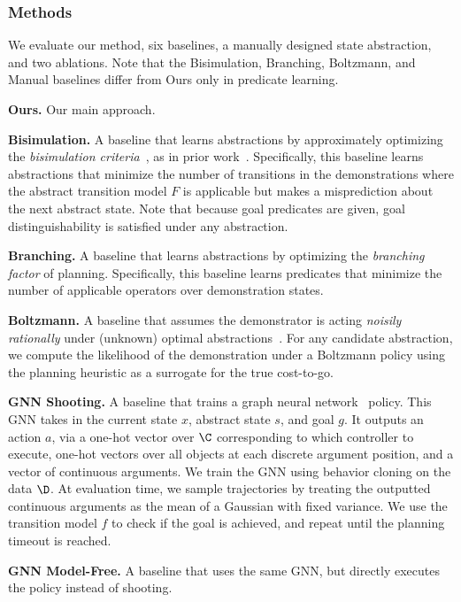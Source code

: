 \subsubsection{Methods} We evaluate our method, six baselines, a manually designed state abstraction, and two ablations.
Note that the Bisimulation, Branching, Boltzmann, and Manual baselines differ from Ours only in predicate learning.
\begin{tightlist}
\item \textbf{Ours.} Our main approach.
\item \textbf{Bisimulation.} A baseline that learns abstractions by approximately optimizing the \emph{bisimulation criteria}~\cite{givan2003equivalence}, as in prior work~\cite{curtis2021discovering}. Specifically, this baseline learns abstractions that minimize the number of transitions in the demonstrations where the abstract transition model $F$ is applicable but makes a misprediction about the next abstract state. Note that because goal predicates are given, goal distinguishability is satisfied under any abstraction.
\item \textbf{Branching.} A baseline that learns abstractions by optimizing the \emph{branching factor} of planning. Specifically, this baseline learns predicates that minimize the number of applicable operators over demonstration states.
\item \textbf{Boltzmann.} A baseline that assumes the demonstrator is acting \emph{noisily rationally} under (unknown) optimal abstractions~\cite{baker2009action}. For any candidate abstraction, we compute the likelihood of the demonstration under a Boltzmann policy using the planning heuristic as a surrogate for the true cost-to-go.
\item \textbf{GNN Shooting.} A baseline that trains a graph neural network~\cite{battaglia2018relational} policy. This GNN takes in the current state $x$, abstract state $s$, and goal $g$. It outputs an action $a$, via a one-hot vector over $\C$ corresponding to which controller to execute, one-hot vectors over all objects at each discrete argument position, and a vector of continuous arguments. We train the GNN using behavior cloning on the data $\D$. At evaluation time, we sample trajectories by treating the outputted continuous arguments as the mean of a Gaussian with fixed variance. We use the transition model $f$ to check if the goal is achieved, and repeat until the planning timeout is reached.
\item \textbf{GNN Model-Free.} A baseline that uses the same GNN, but directly executes the policy instead of shooting.

\end{tightlist}
